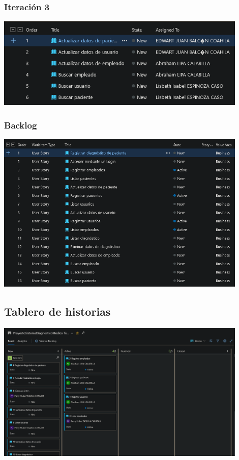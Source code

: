 \documentclass[preprint,12pt]{elsarticle}
\begin{document}
	\subsubsection{Iteración 3}
	\begin{center}
	\includegraphics[width=12cm]{./imagen/Screenshot_5.png}
	\end{center}

	\subsubsection{Backlog}
	\begin{center}
	\includegraphics[width=12cm]{./imagen/Screenshot_8.png}
	\end{center}

	\subsection{Tablero de historias}
	\includegraphics[width=12cm]{./imagen/Screenshot_2020-10-31 ProyectoSistemaDiagnosticoMedico Team Stories Board - Boards.png}
\end{document}
